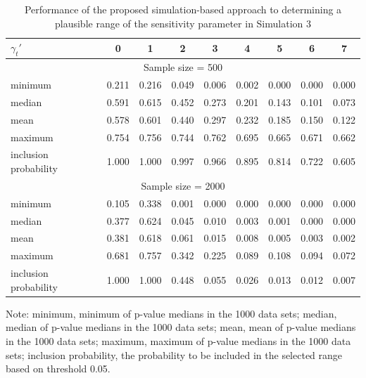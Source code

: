 \documentclass[12pt]{article}
\begin{document}
\begin{table}[htbp]
    \centering
\begin{threeparttable}
    \caption{Performance of the proposed simulation-based approach to determining a plausible range of the sensitivity parameter 
 in Simulation 3}      \label{simu_sen_spec}
    \begin{tabular}{lcccccccc}
    \hline
    $\gamma_t'$ & 0 & 1 & 2 & 3 & 4 & 5 & 6  & 7 \\
    \hline
                  \multicolumn{9}{c}{Sample size = 500} \\
    minimum & 0.211 & 0.216 & 0.049 & 0.006 & 0.002 & 0.000 & 0.000 & 0.000\\
    median &0.591 & 0.615 & 0.452& 0.273& 0.201& 0.143& 0.101& 0.073\\
    mean & 0.578 &0.601 &0.440& 0.297 & 0.232 & 0.185 & 0.150 & 0.122\\
    maximum & 0.754 & 0.756 & 0.744 & 0.762 & 0.695 & 0.665 & 0.671 & 0.662\\
    inclusion probability  & 1.000 &  1.000 &  0.997 &  0.966 &  0.895 &  0.814 &  0.722 &  0.605\\
                   \multicolumn{9}{c}{Sample size = 2000} \\
    minimum & 0.105 & 0.338 & 0.001 & 0.000 & 0.000 & 0.000 & 0.000& 0.000 \\
    median & 0.377 & 0.624 & 0.045 & 0.010 & 0.003 & 0.001 & 0.000 &0.000\\
    mean & 0.381 & 0.618 & 0.061 & 0.015 & 0.008 & 0.005 & 0.003 & 0.002\\
    maximum & 0.681 & 0.757 & 0.342 & 0.225 & 0.089 & 0.108 & 0.094 & 0.072\\
    inclusion probability  & 1.000 & 1.000 & 0.448 & 0.055 & 0.026 & 0.013 & 0.012 & 0.007\\
    \hline
    \end{tabular}
    \begin{tablenotes}
        \small
        \item Note: minimum, minimum of p-value medians in the 1000 data sets; median, median of p-value medians in the 1000 data sets;   
        mean, mean of p-value medians in the 1000 data sets;
        maximum, maximum of p-value medians in the 1000 data sets;
        inclusion probability, the probability to be included in the selected range based on threshold 0.05.
    \end{tablenotes}
\end{threeparttable}
\end{table}
\end{document}
